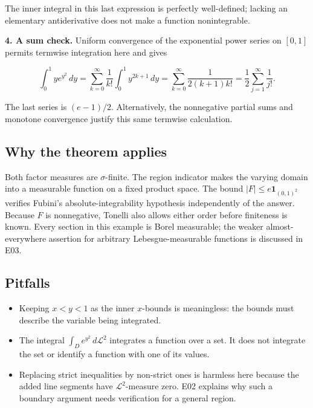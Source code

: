 \documentclass[
  11pt,
]{article}
\providecommand{\tightlist}{%
  \setlength{\itemsep}{0pt}\setlength{\parskip}{0pt}}
\begin{document}
The inner integral in this last expression is perfectly well-defined;
lacking an elementary antiderivative does not make a function
nonintegrable.

\textbf{4. A sum check.} Uniform convergence of the exponential power
series on \([0,1]\) permits termwise integration here and gives

\[
\int_0^1 y e^{y^2}\,dy
=\sum_{k=0}^{\infty}\frac{1}{k!}\int_0^1y^{2k+1}\,dy
=\sum_{k=0}^{\infty}\frac{1}{2(k+1)k!}
=\frac12\sum_{j=1}^{\infty}\frac1{j!}.
\]

The last series is \((e-1)/2\). Alternatively, the nonnegative partial
sums and monotone convergence justify this same termwise calculation.

\subsection{Why the theorem applies}\label{why-the-theorem-applies}

Both factor measures are \(\sigma\)-finite. The region indicator makes
the varying domain into a measurable function on a fixed product space.
The bound \(|F|\leq e\mathbf 1_{(0,1)^2}\) verifies Fubini's
absolute-integrability hypothesis independently of the answer. Because
\(F\) is nonnegative, Tonelli also allows either order before finiteness
is known. Every section in this example is Borel measurable; the weaker
almost-everywhere assertion for arbitrary Lebesgue-measurable functions
is discussed in E03.

\subsection{Pitfalls}\label{pitfalls}

\begin{itemize}
\tightlist
\item
  Keeping \(x<y<1\) as the inner \(x\)-bounds is meaningless: the bounds
  must describe the variable being integrated.
\item
  The integral \(\int_D e^{y^2}\,d\mathcal L^2\) integrates a function
  over a set. It does not integrate the set or identify a function with
  one of its values.
\item
  Replacing strict inequalities by non-strict ones is harmless here
  because the added line segments have \(\mathcal L^2\)-measure zero.
  E02 explains why such a boundary argument needs verification for a
  general region.
\end{itemize}
\end{document}
